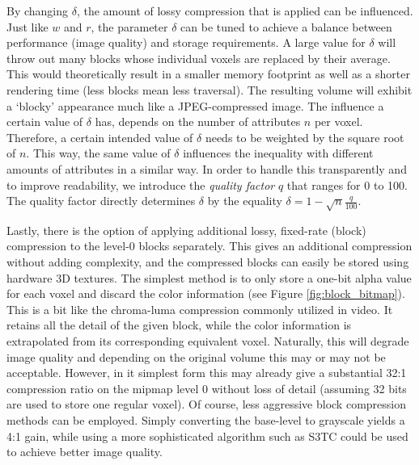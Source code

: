By changing $\delta$, the amount of lossy compression that is applied can be influenced. Just like $w$ and $r$, the parameter $\delta$ can be tuned to achieve a balance between performance (image quality) and storage requirements. A large value for $\delta$ will throw out many blocks whose individual voxels are replaced by their average. This would theoretically result in a smaller memory footprint as well as a shorter rendering time (less blocks mean less traversal). The resulting volume will exhibit a `blocky' appearance much like a JPEG-compressed image.  The influence a certain value of $\delta$ has, depends on the number of attributes $n$ per voxel. Therefore, a certain intended value of $\delta$ needs to be weighted by the square root of $n$. This way, the same value of $\delta$ influences the inequality with different amounts of attributes in a similar way.
In order to handle this transparently and to improve readability, we introduce the \emph{quality factor} $q$ that ranges for 0 to 100. The quality factor directly determines $\delta$ by the equality $\delta = 1 - \sqrt{n}\frac{q}{100}$. 

Lastly, there is the option of applying additional lossy, fixed-rate (block) compression to the level-0 blocks separately. This gives an additional compression without adding complexity, and the compressed blocks can easily be stored using hardware 3D textures. The simplest method is to only store a one-bit alpha value for each voxel and discard the color information (see Figure \ref{fig:block_bitmap}). This is a bit like the chroma-luma compression commonly utilized in video. It retains all the detail of the given block, while the color information is extrapolated from its corresponding equivalent voxel. Naturally, this will degrade image quality and depending on the original volume this may or may not be acceptable. However, in it simplest form this may already give a substantial 32:1 compression ratio on the mipmap level 0 without loss of detail (assuming 32 bits are used to store one regular voxel). Of course, less aggressive block compression methods can be employed. Simply converting the base-level to grayscale yields a 4:1 gain, while using a more sophisticated algorithm such as S3TC could be used to achieve better image quality. 


